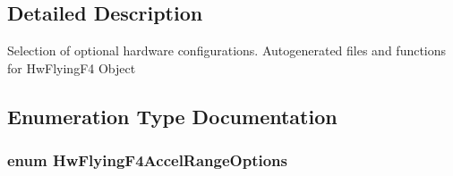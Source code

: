 \subsection{\-Detailed \-Description}
\-Selection of optional hardware configurations. \-Autogenerated files and functions for \-Hw\-Flying\-F4 \-Object 

\subsection{\-Enumeration \-Type \-Documentation}
\hypertarget{group___hw_flying_f4_ga42c6ec05ef8972667d82e0dff20a44e7}{
\subsubsection[{\-Hw\-Flying\-F4\-Accel\-Range\-Options}]{\setlength{\rightskip}{0pt plus 5cm}enum {\bf \-Hw\-Flying\-F4\-Accel\-Range\-Options}}}\label{group___hw_flying_f4_ga42c6ec05ef8972667d82e0dff20a44e7}

